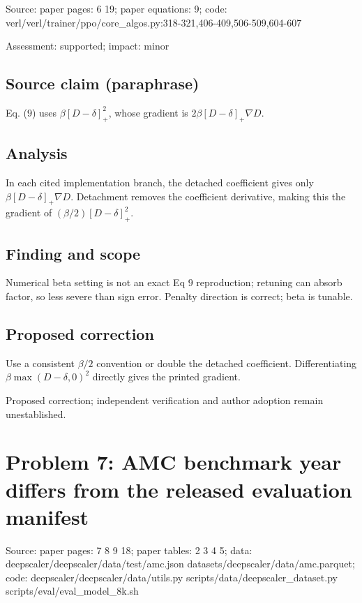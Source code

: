 \documentclass[11pt]{article}
\begin{document}
Source: paper pages: 6 19; paper equations: 9; code: verl/verl/trainer/ppo/core\_algos.py:318-321,406-409,506-509,604-607

Assessment: supported; impact: minor

\subsection*{Source claim (paraphrase)}

Eq. (\(9\)) uses \(\beta[D-\delta]_+^2\), whose gradient is \(2\beta[D-\delta]_+\nabla D\).

\subsection*{Analysis}

In each cited implementation branch, the detached coefficient gives only \(\beta[D-\delta]_+\nabla D\). Detachment removes the coefficient derivative, making this the gradient of \((\beta/2)[D-\delta]_+^2\).

\subsection*{Finding and scope}

Numerical beta setting is not an exact Eq \(9\) reproduction; retuning can absorb factor, so less severe than sign error. Penalty direction is correct; beta is tunable.

\subsection*{Proposed correction}

Use a consistent \(\beta/2\) convention or double the detached coefficient. Differentiating \(\beta\max(D-\delta,0)^2\) directly gives the printed gradient.

Proposed correction; independent verification and author adoption remain unestablished.

\section*{Problem 7: AMC benchmark year differs from the released evaluation manifest}

Source: paper pages: 7 8 9 18; paper tables: 2 3 4 5; data: deepscaler/deepscaler/data/test/amc.json datasets/deepscaler/data/amc.parquet; code: deepscaler/deepscaler/data/utils.py scripts/data/deepscaler\_dataset.py scripts/eval/eval\_model\_8k.sh
\end{document}
